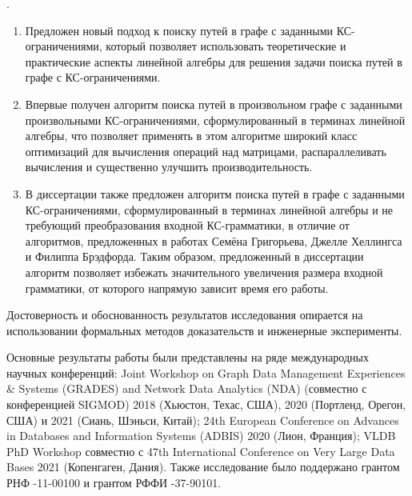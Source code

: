 {\novelty.}
\begin{enumerate}[beginpenalty=10000] %
	
	\item Предложен новый подход к поиску путей в графе с заданными КС-ограничениями, который позволяет использовать теоретические и практические аспекты линейной алгебры для решения задачи поиска путей в графе с КС-ограничениями. 
	
	\item Впервые получен алгоритм поиска путей в произвольном графе с заданными произвольными КС-ограничениями, сформулированный в терминах линейной алгебры, что позволяет применять в этом алгоритме широкий класс оптимизаций для вычисления операций над матрицами, распараллеливать вычисления и существенно улучшить производительность.
	
	\item В диссертации также предложен алгоритм поиска путей в графе с заданными КС-ограничениями, сформулированный в терминах линейной алгебры и не требующий преобразования входной КС-грамматики, в отличие от алгоритмов, предложенных в работах Семёна Григорьева, Джелле Хеллингса и Филиппа Брэдфорда. Таким образом, предложенный в диссертации алгоритм позволяет избежать значительного увеличения размера входной грамматики, от которого напрямую зависит время его работы.
	
	
\end{enumerate}

{\reliability} 
Достоверность и обоснованность результатов исследования опирается на использовании формальных методов доказательств  и инженерные эксперименты.

Основные результаты работы были представлены на ряде международных научных конференций: Joint Workshop on Graph Data Management Experiences \& Systems (GRADES) and Network Data Analytics (NDA) (совместно с конференцией SIGMOD) 2018 (Хьюстон, Техас, США), 2020 (Портленд, Орегон, США) и 2021 (Сиань, Шэньси, Китай); 24th European Conference on Advances in Databases and Information Systems (ADBIS) 2020 (Лион, Франция); VLDB PhD Workshop совместно с 47th International Conference on Very Large Data Bases 2021 (Копенгаген, Дания). Также исследование было поддержано грантом РНФ -11-00100 и грантом РФФИ -37-90101.

